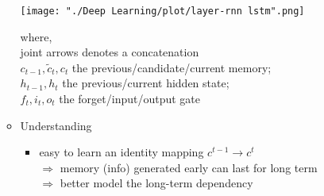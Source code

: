 \begin{itemize}
\begin{itemize}
\begin{minipage}[r]{0.5\linewidth}
	\texttt{[image: "./Deep Learning/plot/layer-rnn lstm".png]}
	\end{minipage}
	\begin{minipage}[l]{\linewidth}
	where, \\ 
	joint arrows denotes a concatenation \\ 
	$c_{t-1}, \widetilde c_t, c_t$ the previous/candidate/current memory; \\
	$h_{t-1},h_t$ the previous/current hidden state; \\ 
	$f_t, i_t, o_t$ the forget/input/output gate
	\end{minipage}

	\item Understanding
		\begin{itemize}
		\item easy to learn an identity mapping $c^{t-1}\rightarrow c^t$ \\
		$\Rightarrow$ memory (info) generated early can last for long term \\
		$\Rightarrow$ better model the long-term dependency
		\end{itemize}

	\end{itemize}


\end{itemize}
